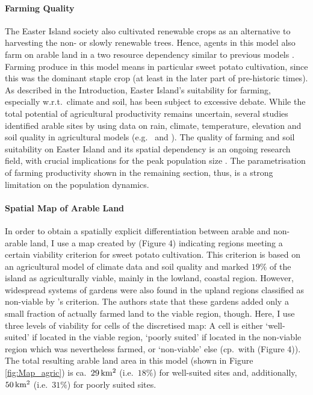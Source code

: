 \paragraph{Farming Quality}
The Easter Island society also cultivated renewable crops as an alternative to harvesting the non- or slowly renewable trees.
Hence, agents in this model also farm on arable land in a two resource dependency similar to previous models \citep{dAlessandro2007}.
Farming produce in this model means in particular sweet potato cultivation, since this was the dominant staple crop \citep{Louwagie2006} (at least in the later part of pre-historic times).
As described in the Introduction, Easter Island's suitability for farming, especially w.r.t.\ climate and soil, has been subject to excessive debate.
While the total potential of agricultural productivity remains uncertain, several studies identified arable sites by using data on rain, climate, temperature, elevation and soil quality in agricultural models (e.g.\ \citet{Louwagie2006} and \citet{Puleston2017}).
The quality of farming and soil suitability on Easter Island and its spatial dependency is an ongoing research field, with crucial implications for the peak population size \citep{Puleston2017}.
The parametrisation of farming productivity shown in the remaining section, thus, is a strong limitation on the population dynamics.

\paragraph{Spatial Map of Arable Land}
In order to obtain a spatially explicit differentiation between arable and non-arable land, I use a map created by \citet{Puleston2017} (Figure 4) indicating regions meeting a certain viability criterion for sweet potato cultivation.
This criterion is based on an agricultural model of climate data and soil quality and marked $19\%$ of the island as agriculturally viable, mainly in the lowland, coastal region.
However, widespread systems of gardens were also found in the upland regions classified as non-viable by \citet{Puleston2017}'s criterion.
The authors state that these gardens added only a small fraction of actually farmed land to the viable region, though.
Here, I use three levels of viability for cells of the discretised map: 
A cell is either `well-suited' if located in the viable region, `poorly suited' if located in the non-viable region which was nevertheless farmed, or `non-viable' else (cp.\ with \citet{Puleston2017} (Figure 4)).
The total resulting arable land area in this model (shown in Figure \ref{fig:Map_agric}) is ca.\ $29\,  {\rm km^2}$ (i.e.\ $18\%$) for well-suited sites and, additionally, $50\, {\rm km^2}$ (i.e.\ $31\%$) for poorly suited sites.

